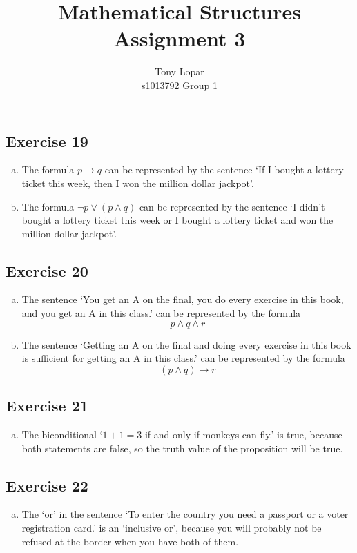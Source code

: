 \documentclass[a4paper]{article}
\title{Mathematical Structures\\Assignment 3}
\author{Tony Lopar \\ s1013792 \quad Group 1}
\newcommand{\exerciseenum}[2]{\subsection*{Exercise #1}{\begin{enumerate}[a)]#2\end{enumerate}}}
\begin{document}
\maketitle


\exerciseenum{19}{%
\addtocounter{enumi}{2}
\item%
The formula
$p \to  q$
can be represented by the sentence
`If I bought a lottery ticket this week, then I won the million dollar jackpot'.
\addtocounter{enumi}{4}
\item%
The formula
$\neg p \lor  (p \land  q)$
can be represented by the sentence
`I didn't bought a lottery ticket this week or I bought a lottery ticket and won the million dollar jackpot'.
}

\exerciseenum{20}{%
\addtocounter{enumi}{1}
\item%
The sentence
`You get an A on the final, you do every exercise in this
book, and you get an A in this class.'
can be represented by the formula
\[p \land q \land r\]
\addtocounter{enumi}{2}
\item%
The sentence
`Getting an A on the final and doing every exercise in
this book is sufficient for getting an A in this class.'
can be represented by the formula
\[(p \land q) \to r\]
}

\exerciseenum{21}{%
\addtocounter{enumi}{2}
\item%
The biconditional
`$1 + 1 = 3$ if and only if monkeys can fly.'
is true, because both statements are false, so the truth value of the proposition will be true.
}

\exerciseenum{22}{%
\addtocounter{enumi}{2}
\item%
The `or' in the sentence
`To enter the country you need a passport or a voter
registration card.'
is an `inclusive or',
because you will probably not be refused at the border when you have both of them.
}
\end{document}
